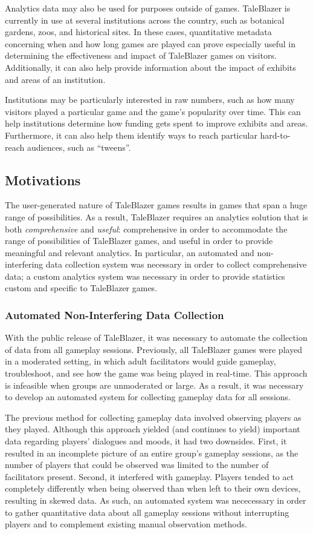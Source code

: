 Analytics data may also be used for purposes outside of games. TaleBlazer is currently in use at several institutions across the country, such as botanical gardens, zoos, and historical sites. In these cases, quantitative metadata concerning when and how long games are played can prove especially useful in determining the effectiveness and impact of TaleBlazer games on visitors. Additionally, it can also help provide information about the impact of exhibits and areas of an institution. 

Institutions may be particularly interested in raw numbers, such as how many visitors played a particular game and the game's popularity over time. This can help institutions determine how funding gets spent to improve exhibits and areas. Furthermore, it can also help them identify ways to reach particular hard-to-reach audiences, such as ``tweens''.

\subsection{Motivations}
The user-generated nature of TaleBlazer games results in games that span a huge range of possibilities. As a result, TaleBlazer requires an analytics solution that is both \textit{comprehensive} and \textit{useful}: comprehensive in order to accommodate the range of possibilities of TaleBlazer games, and useful in order to provide meaningful and relevant analytics. In particular, an automated and non-interfering data collection system was necessary in order to collect comprehensive data; a custom analytics system was necessary in order to provide statistics custom and specific to TaleBlazer games.

\subsubsection{Automated Non-Interfering Data Collection}

With the public release of TaleBlazer, it was necessary to automate the collection of data from all gameplay sessions. Previously, all TaleBlazer games were played in a moderated setting, in which adult facilitators would guide gameplay, troubleshoot, and see how the game was being played in real-time. This approach is infeasible when groups are unmoderated or large. As a result, it was necessary to develop an automated system for collecting gameplay data for all sessions.

The previous method for collecting gameplay data involved observing players as they played. Although this approach yielded (and continues to yield) important data regarding players' dialogues and moods, it had two downsides. First, it resulted in an incomplete picture of an entire group's gameplay sessions, as the number of players that could be observed was limited to the number of facilitators present. Second, it interfered with gameplay. Players tended to act completely differently when being observed than when left to their own devices, resulting in skewed data. As such, an automated system was nececessary in order to gather quantitative data about all gameplay sessions without interrupting players and to complement existing manual observation methods.


